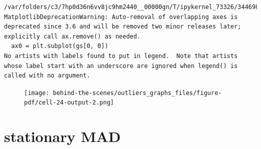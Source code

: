 \documentclass[
  letterpaper,
  DIV=11,
  numbers=noendperiod,
  oneside]{scrreprt}
\begin{document}
\begin{verbatim}
/var/folders/c3/7hp0d36n6vv8jc9hm2440__00000gn/T/ipykernel_73326/3446982039.py:6: MatplotlibDeprecationWarning: Auto-removal of overlapping axes is deprecated since 3.6 and will be removed two minor releases later; explicitly call ax.remove() as needed.
  ax0 = plt.subplot(gs[0, 0])
No artists with labels found to put in legend.  Note that artists whose label start with an underscore are ignored when legend() is called with no argument.
\end{verbatim}

\begin{figure}[H]

{\centering \texttt{[image: behind-the-scenes/outliers\_graphs\_files/figure-pdf/cell-24-output-2.png]}

}

\end{figure}

\hypertarget{stationary-mad}{%
\section{stationary MAD}\label{stationary-mad}}
\end{document}
